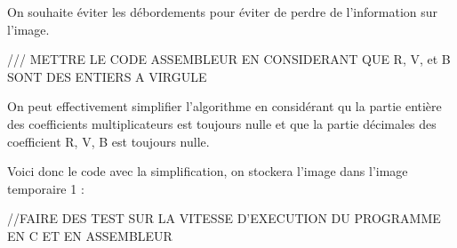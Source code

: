 \documentclass[11pt]{report}
\begin{document}
On souhaite éviter les débordements pour éviter de perdre de l'information sur l'image.

\medskip

/// METTRE LE CODE ASSEMBLEUR EN CONSIDERANT QUE R, V, et B SONT DES ENTIERS A VIRGULE



On peut effectivement simplifier l'algorithme en considérant qu la partie entière des coefficients multiplicateurs est toujours nulle et que la partie décimales des coefficient R, V, B est toujours nulle.

Voici donc le code avec la simplification, on stockera l'image dans l'image temporaire 1 : 



//FAIRE DES TEST SUR LA VITESSE D'EXECUTION DU PROGRAMME EN C ET EN ASSEMBLEUR
\end{document}
